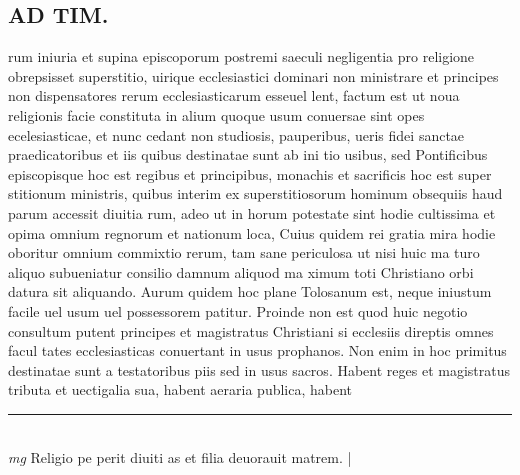 \documentclass{article}
\begin{document}
\begin{pages}
\section*{AD TIM. }
\marginpar{[ p.157 ]}\pstart rum iniuria et supina episcoporum postremi saeculi negligentia pro religione obrepsisset superstitio, uirique ecclesiastici dominari non ministrare et principes non dispensatores rerum ecclesiasticarum esseuel lent, factum est ut noua religionis facie constituta in alium quoque usum conuersae sint opes ecelesiasticae, et nunc cedant non studiosis, pauperibus, ueris fidei sanctae praedicatoribus et iis quibus destinatae sunt ab ini tio usibus, sed Pontificibus episcopisque hoc est regibus et principibus, monachis et sacrificis hoc est super stitionum ministris, quibus interim ex superstitiosorum hominum obsequiis haud parum accessit diuitia rum, adeo ut in horum potestate sint hodie cultissima et opima omnium regnorum et nationum loca, Cuius quidem rei gratia mira hodie oboritur omnium commixtio rerum, tam sane periculosa ut nisi huic ma turo aliquo subueniatur consilio damnum aliquod ma ximum toti Christiano orbi datura sit aliquando. Aurum quidem hoc plane Tolosanum est, neque iniustum facile uel usum uel possessorem patitur. Proinde non est quod huic negotio consultum putent principes et magistratus Christiani si ecclesiis direptis omnes facul tates ecclesiasticas conuertant in usus prophanos. Non enim in hoc primitus destinatae sunt a testatoribus piis sed in usus sacros. Habent reges et magistratus tributa et uectigalia sua, habent aeraria publica, habent  \pend
\vspace{0.5cm}\noindent
\vspace{0.2cm}\rule{1cm}{0.2pt}\\ 
\hspace{0.2cm}\textit{mg}
\footnotesize Religio pe perit diuiti as et filia deuorauit matrem. 
\normalsize| 

\end{pages}
\end{document}
